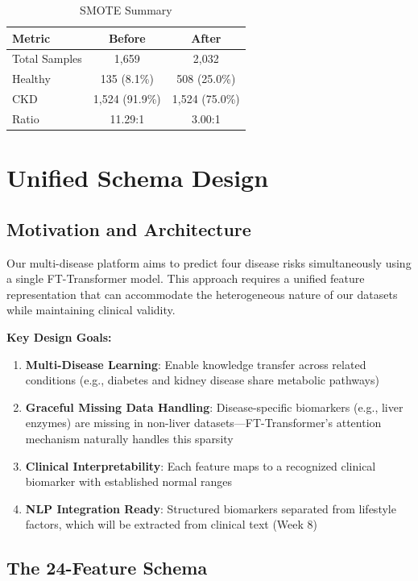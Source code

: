 \documentclass[11pt,a4paper]{article}
\begin{document}
\begin{table}[H]
\centering
\caption{SMOTE Summary}
\begin{tabular}{lcc}
\toprule
\textbf{Metric} & \textbf{Before} & \textbf{After} \\
\midrule
Total Samples & 1,659 & 2,032 \\
Healthy & 135 (8.1\%) & 508 (25.0\%) \\
CKD & 1,524 (91.9\%) & 1,524 (75.0\%) \\
Ratio & 11.29:1 & 3.00:1 \\
\bottomrule
\end{tabular}
\end{table}

\section{Unified Schema Design}

\subsection{Motivation and Architecture}

Our multi-disease platform aims to predict four disease risks simultaneously using a single FT-Transformer model. This approach requires a unified feature representation that can accommodate the heterogeneous nature of our datasets while maintaining clinical validity.

\textbf{Key Design Goals:}
\begin{enumerate}
    \item \textbf{Multi-Disease Learning}: Enable knowledge transfer across related conditions (e.g., diabetes and kidney disease share metabolic pathways)
    \item \textbf{Graceful Missing Data Handling}: Disease-specific biomarkers (e.g., liver enzymes) are missing in non-liver datasets—FT-Transformer's attention mechanism naturally handles this sparsity
    \item \textbf{Clinical Interpretability}: Each feature maps to a recognized clinical biomarker with established normal ranges
    \item \textbf{NLP Integration Ready}: Structured biomarkers separated from lifestyle factors, which will be extracted from clinical text (Week 8)
\end{enumerate}

\subsection{The 24-Feature Schema}
\end{document}
